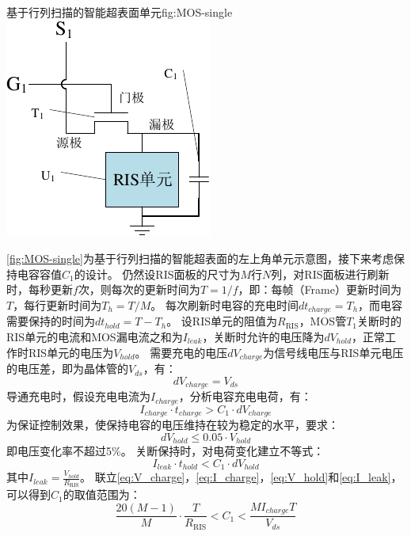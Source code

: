 \documentclass[supercite]{HustGraduPaper}
\begin{document}
\begin{generalfig}[htb]{基于行列扫描的智能超表面单元}{fig:MOS-single}
	\includegraphics[width=0.4\linewidth]{Figures/MOS-single.pdf}
\end{generalfig}

\autoref{fig:MOS-single}为基于行列扫描的智能超表面的左上角单元示意图，接下来考虑保持电容容值$C_1$的设计。
仍然设RIS面板的尺寸为$M$行$N$列，对RIS面板进行刷新时，每秒更新$f$次，则每次的更新时间为$T=1/f$，即：每帧（Frame）更新时间为$T$，每行更新时间为$T_h=T/M$。
每次刷新时电容的充电时间$dt_{charge}=T_h$，而电容需要保持的时间为$dt_{hold}=T-T_h$。
设RIS单元的阻值为$R_\mathrm{RIS}$，MOS管$T_1$关断时的RIS单元的电流和MOS漏电流之和为$I_{leak}$，关断时允许的电压降为$dV_{hold}$，正常工作时RIS单元的电压为$V_{hold}$。
需要充电的电压$dV_{charge}$为信号线电压与RIS单元电压的电压差，即为晶体管的$V_{ds}$，有：
\begin{equation}
	dV_{charge} = V_{ds}
	\label{eq:V_charge}
\end{equation}
导通充电时，假设充电电流为$I_{charge}$，分析电容充电电荷，有：
\begin{equation}
	I_{charge} \cdot t_{charge}>C_1 \cdot dV_{charge}
	\label{eq:I_charge}
\end{equation}
为保证控制效果，使保持电容的电压维持在较为稳定的水平，要求：
\begin{equation}
	dV_{hold} \le 0.05 \cdot V_{hold}
	\label{eq:V_hold}
\end{equation}
即电压变化率不超过5\%。
关断保持时，对电荷变化建立不等式：
\begin{equation}
	I_{leak} \cdot t_{hold} < C_1 \cdot dV_{hold}
	\label{eq:I_leak}
\end{equation}
其中$I_{leak} = \frac{V_{hold}}{R_\mathrm{RIS}}$。
联立\autoref{eq:V_charge}，\autoref{eq:I_charge}，\autoref{eq:V_hold}和\autoref{eq:I_leak}，可以得到$C_1$的取值范围为：
\begin{equation}
	\frac{20(M-1)}{M} \cdot \frac{T}{R_\mathrm{RIS}} < C_1 < \frac{MI_{charge}T}{V_{ds}}
	\label{eq:C1_value}
\end{equation}
\end{document}
